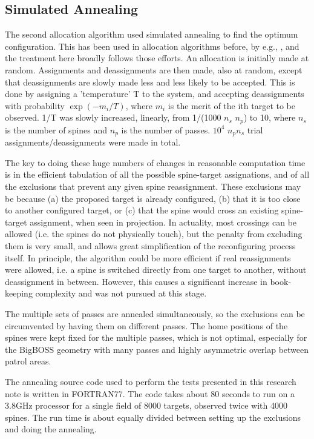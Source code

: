 \documentclass{article}
\begin{document}
\subsection{Simulated Annealing}
The second allocation algorithm used simulated annealing to find the
optimum configuration. This has been used in allocation algorithms before,
by e.g., \cite{Multi}, and the treatment here broadly follows those
efforts. An allocation is initially made at random. Assignments and
deassignments are then made, also at random, except that deassignments
are slowly made less and less likely to be accepted. This is done by assigning
a 'temperature' T to the system, and accepting deassignments with
probability $\exp(-m_i/T)$, where $m_i$ is the merit of the ith target to be
observed. 1/T was slowly increased, linearly, from 1/(1000 $n_s$ $n_p$) to 10,
where $n_s$ is the number of spines and $n_p$ is the number of passes. $10^4$
$n_pn_s$ trial assignments/deassignments were made in total.

The key to doing these huge numbers of changes in reasonable computation
time is in the efficient tabulation of all the possible spine-target
assignations, and of all the exclusions that prevent any given spine
reassignment. These exclusions may be because (a) the proposed target is
already configured, (b) that it is too close to another configured target,
or (c) that the spine would cross an existing spine-target assignment, when
seen in projection. In actuality, most crossings can be allowed (i.e. the
spines do not physically touch), but the penalty from excluding them is
very small, and allows great simplification of the reconfiguring process
itself. In principle, the algorithm could be more efficient if real
reassignments were allowed, i.e. a spine is switched directly from one
target to another, without deassignment in between. However, this causes a
significant increase in book-keeping complexity and was not pursued at
this stage.

The multiple sets of passes are annealed simultaneously, so the exclusions
can be circumvented by having them on different passes. The home positions
of the spines were kept fixed for the multiple passes, which is not
optimal, especially for the BigBOSS geometry with many passes and highly
asymmetric overlap between patrol areas. 

The annealing source code used to perform the tests presented in this
research note is written in FORTRAN77. The code takes about 80 seconds
to run on a 3.8GHz processor for a single field of 8000 targets,
observed twice with 4000 spines. The run time is about equally divided
between setting up the exclusions and doing the annealing. 
\end{document}
